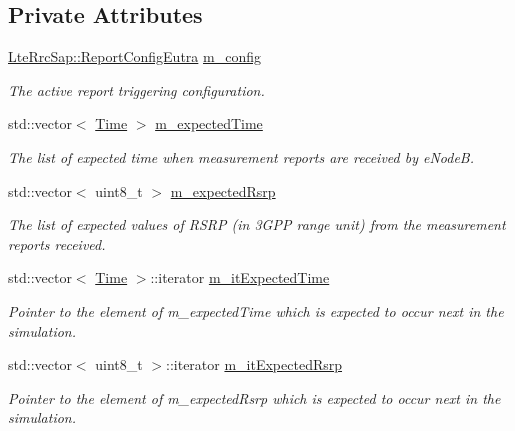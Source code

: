 \subsection*{Private Attributes}
\begin{DoxyCompactItemize}
\item 
\hyperlink{structns3_1_1LteRrcSap_1_1ReportConfigEutra}{Lte\+Rrc\+Sap\+::\+Report\+Config\+Eutra} \hyperlink{classLteUeMeasurementsPiecewiseTestCase1_a3238ee6ab2ac6c4abdfa4438e9f5e3e0}{m\+\_\+config}
\begin{DoxyCompactList}\small\item\em The active report triggering configuration. \end{DoxyCompactList}\item 
std\+::vector$<$ \hyperlink{classns3_1_1Time}{Time} $>$ \hyperlink{classLteUeMeasurementsPiecewiseTestCase1_a1906d2a638148579c52d6dcf370b84a2}{m\+\_\+expected\+Time}
\begin{DoxyCompactList}\small\item\em The list of expected time when measurement reports are received by e\+NodeB. \end{DoxyCompactList}\item 
std\+::vector$<$ uint8\+\_\+t $>$ \hyperlink{classLteUeMeasurementsPiecewiseTestCase1_abac81553dc6e6c5f9a0721a609647753}{m\+\_\+expected\+Rsrp}
\begin{DoxyCompactList}\small\item\em The list of expected values of R\+S\+RP (in 3\+G\+PP range unit) from the measurement reports received. \end{DoxyCompactList}\item 
std\+::vector$<$ \hyperlink{classns3_1_1Time}{Time} $>$\+::iterator \hyperlink{classLteUeMeasurementsPiecewiseTestCase1_a6b6edd027bcc1219f66b88a318672dca}{m\+\_\+it\+Expected\+Time}
\begin{DoxyCompactList}\small\item\em Pointer to the element of {\ttfamily m\+\_\+expected\+Time} which is expected to occur next in the simulation. \end{DoxyCompactList}\item 
std\+::vector$<$ uint8\+\_\+t $>$\+::iterator \hyperlink{classLteUeMeasurementsPiecewiseTestCase1_ad0362797e90952c7ffd619a9aa59309b}{m\+\_\+it\+Expected\+Rsrp}
\begin{DoxyCompactList}\small\item\em Pointer to the element of {\ttfamily m\+\_\+expected\+Rsrp} which is expected to occur next in the simulation. \end{DoxyCompactList}\item 

\end{DoxyCompactItemize}
